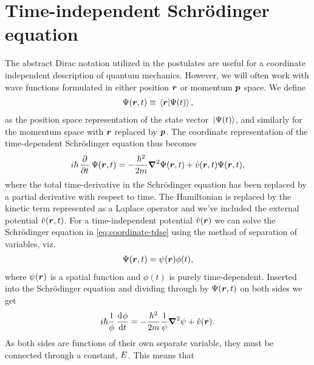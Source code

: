     \section{Time-independent Schrödinger equation}
        The abstract Dirac notation utilized in the postulates are useful for a
        coordinate independent description of quantum mechanics.
        However, we will often work with wave functions formulated in either
        position $\boldsymbol{r}$ or momentum $\boldsymbol{p}$ space.
        We define
        \begin{align}
            \Psi(\boldsymbol{r}, t) \equiv \braket*{\boldsymbol{r}}{\Psi(t)},
        \end{align}
        as the position space representation of the state vector
        $\ket*{\Psi(t)}$, and similarly for the momentum space with $\boldsymbol{r}$
        replaced by $\boldsymbol{p}$.
        The coordinate representation of the time-dependent Schrödinger equation
        thus becomes
        \begin{align}
            i\hslash\dpd{}{t}\Psi(\vfg{r}, t)
            = -\frac{\hslash^2}{2m}\vfg{\nabla}^2\Psi(\vfg{r}, t)
            + \hat{v}(\vfg{r}, t)\Psi(\vfg{r}, t),
            \label{eq:coordinate-tdse}
        \end{align}
        where the total time-derivative in the Schrödinger equation has been
        replaced by a partial derivative with respect to time.
        The Hamiltonian is replaced by the kinetic term represented as a Laplace
        operator and we've included the external potential $\hat{v}(\boldsymbol{r},
        t)$.
        For a time-independent potential $\hat{v}(\boldsymbol{r})$ we can solve the
        Schrödinger equation in \autoref{eq:coordinate-tdse} using the method of
        separation of variables, viz.
        \begin{align}
            \Psi(\boldsymbol{r}, t) = \psi(\boldsymbol{r})\phi(t),
        \end{align}
        where $\psi(\boldsymbol{r})$ is a spatial function and $\phi(t)$ is purely
        time-dependent.
        Inserted into the Schrödinger equation and dividing through by
        $\Psi(\boldsymbol{r}, t)$ on both sides we get
        \begin{align}
            i\hslash\frac{1}{\phi}\dod{\phi}{t}
            = -\frac{\hslash^2}{2m}\frac{1}{\psi}
            \vfg{\nabla}^2\psi + \hat{v}(\vfg{r}).
        \end{align}
        As both sides are functions of their own separate variable, they must be
        connected through a constant, $E$.
        This means that
